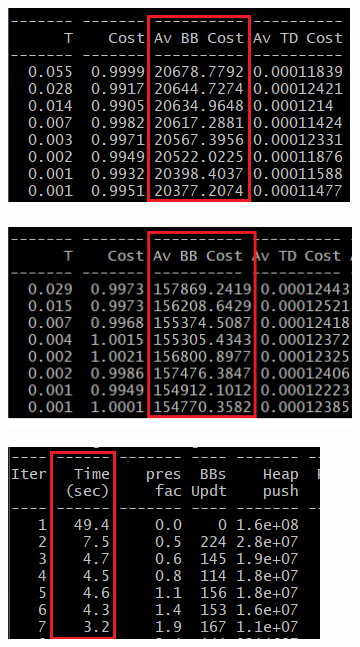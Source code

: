 \begin{figure}
	\begin{subfigure}[b]{0.49\linewidth}
		\includegraphics[width=\linewidth]{plots/log_place_ref.png}
	\end{subfigure}
	\hfill
	\begin{subfigure}[b]{0.49\linewidth}
		\includegraphics[width=\linewidth]{plots/log_place_cnn.png}
	\end{subfigure}
	\begin{subfigure}[b]{0.49\linewidth}
		\includegraphics[width=\linewidth]{plots/log_route_ref.png}

\end{subfigure}
\end{figure}
